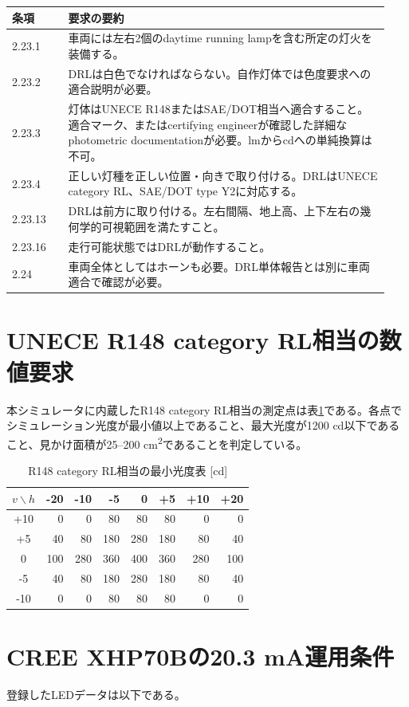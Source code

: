 \documentclass[11pt,a4paper]{article}
\begin{document}
\begin{longtable}{p{0.14\linewidth}p{0.80\linewidth}}
\toprule
条項 & 要求の要約 \\
\midrule
2.23.1 & 車両には左右2個のdaytime running lampを含む所定の灯火を装備する。\\
2.23.2 & DRLは白色でなければならない。自作灯体では色度要求への適合説明が必要。\\
2.23.3 & 灯体はUNECE R148またはSAE/DOT相当へ適合すること。適合マーク、またはcertifying engineerが確認した詳細なphotometric documentationが必要。lmからcdへの単純換算は不可。\\
2.23.4 & 正しい灯種を正しい位置・向きで取り付ける。DRLはUNECE category RL、SAE/DOT type Y2に対応する。\\
2.23.13 & DRLは前方に取り付ける。左右間隔、地上高、上下左右の幾何学的可視範囲を満たすこと。\\
2.23.16 & 走行可能状態ではDRLが動作すること。\\
2.24 & 車両全体としてはホーンも必要。DRL単体報告とは別に車両適合で確認が必要。\\
\bottomrule
\end{longtable}

\section{UNECE R148 category RL相当の数値要求}
本シミュレータに内蔵したR148 category RL相当の測定点は表\ref{tab:r148}である。各点でシミュレーション光度が最小値以上であること、最大光度が1200 cd以下であること、見かけ面積が25--200 cm\textsuperscript{2}であることを判定している。

\begin{table}[H]
\centering
\caption{R148 category RL相当の最小光度表 [cd]}
\label{tab:r148}
\begin{tabular}{c|rrrrrrr}
\toprule
$v\backslash h$ & -20 & -10 & -5 & 0 & +5 & +10 & +20\\
\midrule
+10 & 0 & 0 & 80 & 80 & 80 & 0 & 0\\
+5  & 40 & 80 & 180 & 280 & 180 & 80 & 40\\
0   & 100 & 280 & 360 & 400 & 360 & 280 & 100\\
-5  & 40 & 80 & 180 & 280 & 180 & 80 & 40\\
-10 & 0 & 0 & 80 & 80 & 80 & 0 & 0\\
\bottomrule
\end{tabular}
\end{table}

\section{CREE XHP70Bの20.3 mA運用条件}
登録したLEDデータは以下である。
\end{document}
